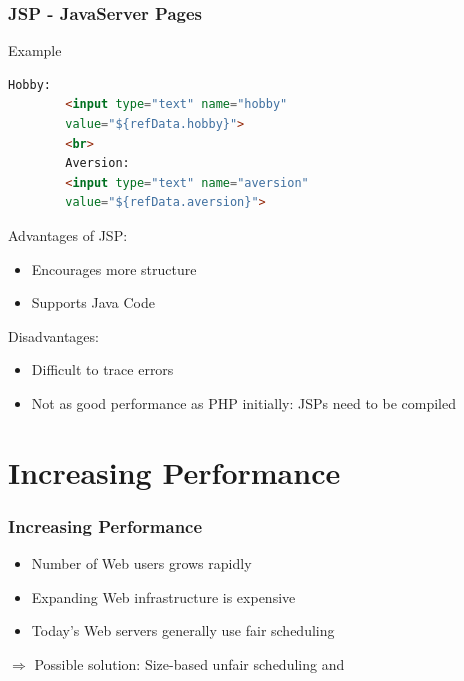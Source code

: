 \documentclass[9pt]{beamer}
\begin{document}
\begin{frame}[fragile]
\frametitle<presentation>{JSP - JavaServer Pages}
  \begin{exampleblock}{Example}
    \begin{lstlisting}[language=html, captionpos=b,caption={Java embedded in HTML. Taken from \cite{downey2008web}},label=lst:jsp]
        Hobby:
        <input type="text" name="hobby" 
        value="${refData.hobby}">
        <br>
        Aversion:
        <input type="text" name="aversion" 
        value="${refData.aversion}">
    \end{lstlisting}
  \end{exampleblock}

\end{frame}

\begin{frame}
  \begin{multicols}{2}
    Advantages of JSP:
    \begin{itemize}
    \item Encourages more structure
    \item Supports Java Code 
    \end{itemize}
    \vfill
    \columnbreak
    
    Disadvantages:
    \begin{itemize}
      \item Difficult to trace errors
      \item Not as good performance as PHP initially: JSPs need to be compiled
    \end{itemize}
  \end{multicols}
\end{frame}

\section{Increasing Performance}

\begin{frame}
\frametitle<presentation>{Increasing Performance}

  \begin{itemize}
    \item Number of Web users grows rapidly
    \item Expanding Web infrastructure is expensive
    \item Today's Web servers generally use fair scheduling 
  \end{itemize}
  $\Longrightarrow$ Possible solution: Size-based unfair scheduling \cite{schroederSize} and \cite{schorederSchedule}

\end{frame}
\end{document}

